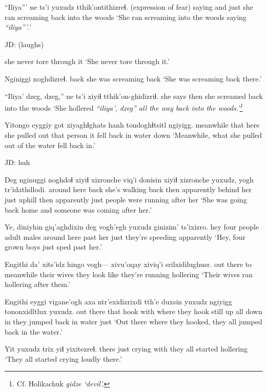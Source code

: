 \documentclass[12pt]{article}
\begin{document}
\gll ``Iliya''' ne ts'i yuxudz tthik'ontithizreɬ.
{(expression of fear)} saying and just {she ran screaming back into the woods}
\glt `She ran screaming into the woods saying \em ``iliya'''.'
\glend

JD:  (laughs)

{{she never tore through it}}
\glt `She never tore through it.'
\glend

\gll Nginiggi noghdizreɬ.
back {she was screaming back}
\glt `She was screaming back there.'
\glend

\gll ``Iliya' dzeg, dzeg,'' ne ts'i xiyiɬ tthik'on-ghidizriɬ.
{} {} {} {she says} {} then {she screamed back into the woods}
\glt `She hollered \em ``iliya', dzeg'' \em all the way back into the woods.'\footnote{Cf. Holikachuk \em gidze `devil'.}
\glend

\gll Yitongo eyggiy got xiyaghɬghats hanh tondoghɬtsitl ngiyigg. 
meanwhile that here {she pulled out} {that person} {it fell back in water} down
\glt `Meanwhile, what she pulled out of the water fell back in.'
\glend

JD:  huh

\gll Deg nginuggi noghdoɬ xiyiɬ xizronche viq'i donisin xiyiɬ xizronche yuxudz, {yogh tr'idathdlodi}.
{around here} back {she's walking back} then apparently  {behind her} {just uphill} then apparently just {{people were running after her}}
\glt `She was going back home and someone was coming after her.'
\glend

\gll Ye, diniyhin giq'aghdixin deg vogh'egh yuxudz ginizim' ts'ixizro. 
hey {four people} {adult males} {around here} {past her} just {they're speeding} apparently
\glt `Hey, four grown boys just sped past her.'
\glend

\gll Engithi da' xits'idz hingo vogh--- xivu'oqay xiviq'i srilxidilughusr.
{out there} {} to meanwhile {} {their wives} {they look like} {they're running hollering}
\glt `Their wives ran hollering after them.'
\glend

\gll Engithi eyggi vigane'ogh axa ntr'exidizrixdi tth'e duxsin yuxudz ngiyigg tononxidltlux yuxudz.
{out there} that hook with {where they hook} still up all {down in} {they jumped back in water} just
\glt `Out there where they hooked, they all jumped back in the water.'
\glend

\gll Yit yuxudz trix yiɬ yixitezreɬ.
there just crying with {they all started hollering}
\glt `They all started crying loudly there.'
\glend
\end{document}

